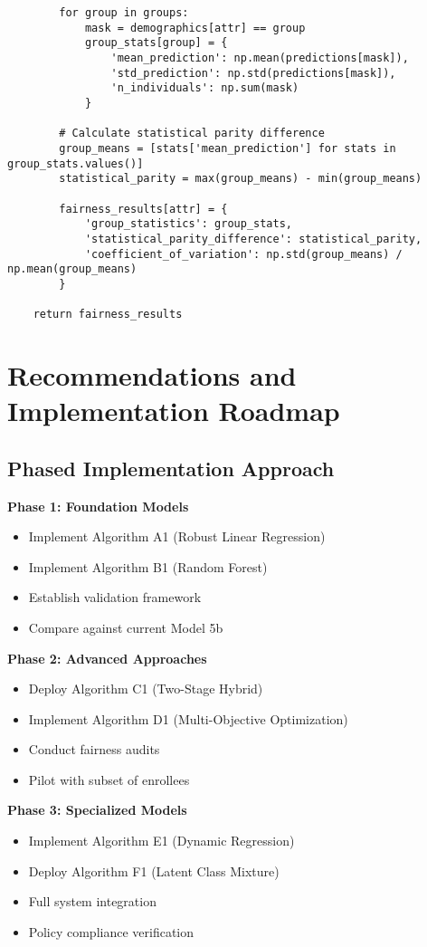 \documentclass[12pt]{article}
\begin{document}
\begin{lstlisting}
        for group in groups:
            mask = demographics[attr] == group
            group_stats[group] = {
                'mean_prediction': np.mean(predictions[mask]),
                'std_prediction': np.std(predictions[mask]),
                'n_individuals': np.sum(mask)
            }
        
        # Calculate statistical parity difference
        group_means = [stats['mean_prediction'] for stats in group_stats.values()]
        statistical_parity = max(group_means) - min(group_means)
        
        fairness_results[attr] = {
            'group_statistics': group_stats,
            'statistical_parity_difference': statistical_parity,
            'coefficient_of_variation': np.std(group_means) / np.mean(group_means)
        }
    
    return fairness_results
\end{lstlisting}

\section{Recommendations and Implementation Roadmap}

\subsection{Phased Implementation Approach}

\textbf{Phase 1: Foundation Models}
\begin{itemize}
    \item Implement Algorithm A1 (Robust Linear Regression)
    \item Implement Algorithm B1 (Random Forest)
    \item Establish validation framework
    \item Compare against current Model 5b
\end{itemize}

\textbf{Phase 2: Advanced Approaches}
\begin{itemize}
    \item Deploy Algorithm C1 (Two-Stage Hybrid)
    \item Implement Algorithm D1 (Multi-Objective Optimization)
    \item Conduct fairness audits
    \item Pilot with subset of enrollees
\end{itemize}

\textbf{Phase 3: Specialized Models}
\begin{itemize}
    \item Implement Algorithm E1 (Dynamic Regression)
    \item Deploy Algorithm F1 (Latent Class Mixture)
    \item Full system integration
    \item Policy compliance verification
\end{itemize}
\end{document}

